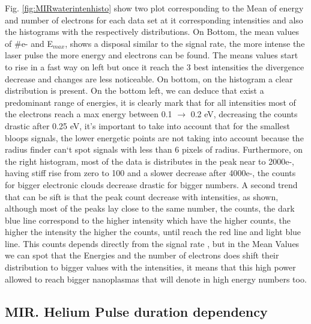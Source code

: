  Fig. \ref{fig:MIRwaterintenhisto} show two plot corresponding to the Mean of energy and number of electrons for each data set at it corresponding intensities and also the histograms with the respectively distributions. On Bottom, the mean values of $\#$e- and E$_{max}$, shows a disposal similar to the signal rate, the more intense the laser pulse the more energy and electrons can be found. The means values start to rise in a fast way on left but once it reach the 3 best intensities the divergence decrease and changes are less noticeable. On bottom, on the histogram a clear distribution is present. On the bottom left, we can deduce that exist a predominant range of energies, it is clearly mark that for all intensities most of the electrons reach a max energy between 0.1 $\rightarrow$ 0.2 eV, decreasing the counts drastic after 0.25 eV, it’s important to take into account that for the smallest bloops signals, the lower energetic points are not taking into account because the radius finder can`t spot signals with less than 6 pixels of radius. Furthermore, on the right histogram, most of the data is distributes in the peak near to 2000e-, having stiff rise from zero to 100 and a slower decrease after 4000e-, the counts for bigger electronic clouds  decrease drastic for bigger numbers. A second trend that can be sift is that the peak count decrease with intensities, as shown, although most of the peaks lay close to the same number, the counts, the dark blue line correspond to the higher intensity which have the higher counts, the higher the intensity the higher the counts, until reach the red line and light blue line. This counts depends directly from the signal rate , but in the Mean Values we can spot that the Energies and the number of electrons does shift their distribution to bigger values with the intensities, it means that this high power allowed to reach bigger nanoplasmas that will denote in high energy numbers too.
 
 
 
\subsection{MIR. Helium Pulse duration dependency}
 
